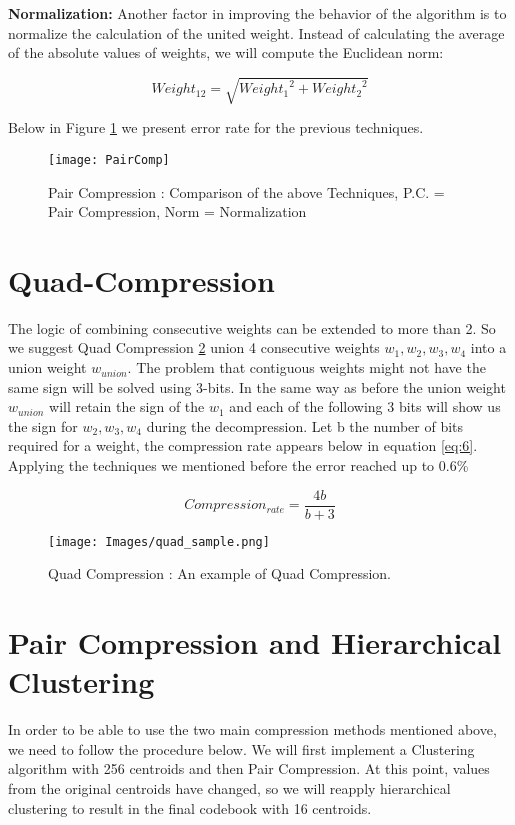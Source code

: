  \textbf{Normalization: }Another factor in improving the behavior of the algorithm is to normalize the calculation of the united weight. Instead of calculating the average of the absolute values of weights, we will compute the Euclidean norm:

\begin{equation}\label{eq:7}
   Weight_{12} = \sqrt{{Weight_{1}}^{2}+{Weight_{2}}^{2}}
   \end{equation} \newline
   
Below in Figure \ref{fig:18} we present error rate for the previous techniques.

\begin{figure}[h]
\centering
\texttt{[image: PairComp]} 
\decoRule
\caption[Pair Compression]{Pair Compression : Comparison of the above Techniques,
P.C. = Pair Compression, Norm = Normalization
}
\label{fig:18}
\end{figure}


\section{Quad-Compression}
The logic of combining consecutive weights can be extended to more than 2. So we suggest Quad Compression \ref{fig:quad_sample} union 4 consecutive weights $w_{1},w_{2},w_{3},w_{4}$ into a union weight $w_{union}$. The problem that contiguous weights might not have the same sign will be solved using 3-bits. In the same way as before the union weight $w_{union}$ will retain the sign of the $w_{1}$ and each of the following 3 bits will show us the sign for $w_{2},w_{3},w_{4}$ during the decompression. Let b the number of bits required for a weight, the compression rate appears below in equation \ref{eq:6}.
Applying the techniques we mentioned before the error reached up to 0.6\%

\begin{equation}\label{eq:7}
   Compression_{rate} = \frac{4b}{b+3}  \end{equation}


\begin{figure}[h]
\centering
\texttt{[image: Images/quad\_sample.png]} 
\decoRule
\caption[Quad Compression example]{Quad Compression : An example of Quad Compression. 
}
\label{fig:quad_sample}
\end{figure}

\section{Pair Compression and Hierarchical Clustering}
In order to be able to use the two main compression methods mentioned above, we need to follow the procedure below. We will first implement a Clustering algorithm with 256 centroids and then Pair Compression. At this point, values from the original centroids have changed, so we will reapply hierarchical clustering to result in the final codebook with 16 centroids.

